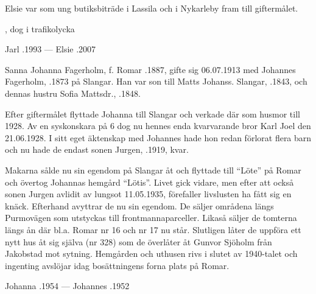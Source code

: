 Elsie var som ung butiksbiträde i Lassila och i Nykarleby fram till giftermålet.
\begin{jhchildren}
  \item {}
  \item {}, dog i trafikolycka
\end{jhchildren}

Jarl .1993  ---  Elsie .2007



%

%
Sanna Johanna Fagerholm, f. Romar .1887, gifte sig 06.07.1913 med Johannes Fagerholm, .1873 på Slangar. Han var son till Matts Johanss. Slangar, .1843, och dennas hustru Sofia Mattsdr., .1848.

Efter giftermålet flyttade Johanna till Slangar och verkade där som husmor till 1928. Av en syskonskara på 6 dog nu hennes enda kvarvarande bror Karl Joel den 21.06.1928. I sitt eget äktenskap med Johannes hade hon redan förlorat flera barn och nu hade de endast sonen Jurgen, .1919, kvar.


Makarna sålde nu sin egendom på Slangar åt  och flyttade till ``Löte'' på Romar och övertog Johannas hemgård  ``Lötis''. Livet gick vidare, men efter att också sonen Jurgen avlidit av lungsot 11.05.1935, förefaller livslusten ha fått sig en knäck. Efterhand avyttrar de nu sin egendom. De säljer områdena  längs Purmovägen som utstyckas till frontmannaparceller. Likaså säljer de tomterna längs ån där bl.a.  Romar nr 16 och nr 17 nu står. Slutligen låter de uppföra ett nytt hus åt sig själva (nr 328) som de överlåter åt Gunvor Sjöholm från Jakobstad mot sytning. Hemgården och uthusen rivs i slutet av 1940-talet och ingenting avslöjar idag bosättningens forna plats på Romar.

Johanna .1954  ---  Johannes .1952


